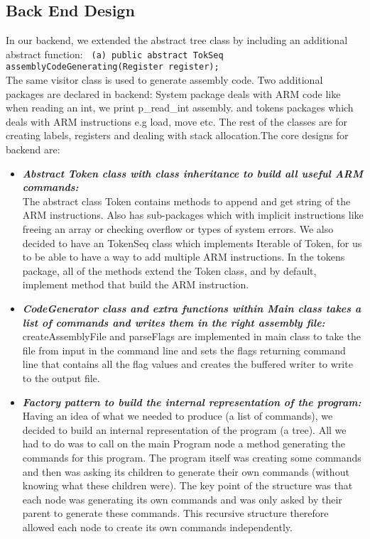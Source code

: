 \documentclass[a4paper]{article}
\theoremstyle{definition}
\begin{document}
\subsection{Back End Design}
In our backend, we extended the abstract tree class by including an additional abstract function:
\texttt{
\noindent
\phantom{3ex}(a) public abstract TokSeq assemblyCodeGenerating(Register register);
}
\\The same visitor class is used to generate assembly code. Two additional packages are declared in backend: System package deals with ARM code like when reading an int, we print p_read_int assembly. and tokens packages which deals with ARM instructions e.g load, move etc. The rest of the classes are for creating labels, registers and dealing with stack allocation.The core designs for backend are:
\begin{itemize}
\item\textbf{\textit{Abstract Token class with class inheritance to build all useful ARM commands:}}
\\
The abstract class Token contains methods to append and get string of the ARM instructions. Also has sub-packages which with implicit instructions like freeing an array or checking overflow or types of system errors. We also decided to have an TokenSeq class which implements Iterable of Token, for us to be able to have a way to add multiple ARM instructions.  In the tokens package, all of the methods extend the Token class, and by default, implement method that build the ARM instruction.
\end{itemize}

\begin{itemize}
\item\textbf{\textit{CodeGenerator class and extra functions within Main class takes a list of commands and writes them in the right assembly ﬁle:}}
\\
createAssemblyFile and parseFlags are implemented in main class to take the file from input in the command line and sets the flags returning command line that contains all the flag values and creates the buffered writer to write to the output file.
\end{itemize}

\begin{itemize}
\item\textbf{\textit{ Factory pattern to build the internal representation of the program:}}
\\
Having an idea of what we needed to produce (a list of commands), we decided to build an internal representation of the program (a tree). All we had to do was to call on the main Program node a method generating the commands for this program. The program itself was creating some commands and then was asking its children to generate their own commands (without knowing what these children were). The key point of the structure was that each node was generating its own commands and was only asked by their parent to generate these commands. This recursive structure therefore allowed each node to create its own commands independently.
\end{itemize}
\end{document}
